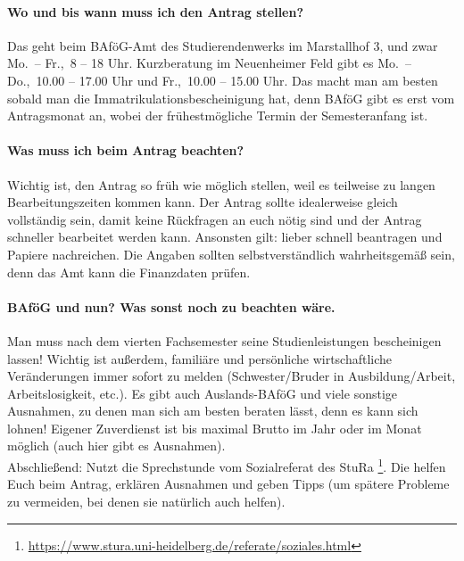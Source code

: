 \paragraph{Wo und bis wann muss ich den Antrag stellen?}
Das geht beim BAföG-Amt des Studierendenwerks im Marstallhof 3, und zwar Mo.\ -- Fr.,\ 8 -- 18 Uhr. Kurzberatung im Neuenheimer Feld gibt es Mo.\ -- Do.,\ 10.00 -- 17.00 Uhr und Fr.,\ 10.00 -- 15.00 Uhr. Das macht man am besten sobald man die Immatrikulationsbescheinigung hat, denn BAföG gibt es erst vom Antragsmonat an, wobei der frühestmögliche Termin der Semesteranfang ist.

\paragraph{Was muss ich beim Antrag beachten?}
Wichtig ist, den Antrag so früh wie möglich stellen, weil es teilweise zu langen Bearbeitungszeiten kommen kann. Der Antrag sollte idealerweise gleich vollständig sein, damit keine Rückfragen an euch nötig sind und der Antrag schneller bearbeitet werden kann. Ansonsten gilt: lieber schnell beantragen und Papiere nachreichen. Die Angaben sollten selbstverständlich wahrheitsgemäß sein, denn das Amt kann die Finanzdaten prüfen.

\paragraph{BAföG und nun? Was sonst noch zu beachten wäre.}
Man muss nach dem vierten Fachsemester seine Studienleistungen bescheinigen lassen! Wichtig ist außerdem,  familiäre und persönliche wirtschaftliche Veränderungen immer sofort zu melden (Schwester/Bruder in Ausbildung/Arbeit, Arbeitslosigkeit, etc.). Es gibt auch Auslands-BAföG und viele sonstige Ausnahmen, zu denen man sich am besten beraten lässt, denn es kann sich lohnen! Eigener Zuverdienst ist bis maximal  Brutto im Jahr oder  im Monat möglich (auch hier gibt es Ausnahmen).\\[5mm]

\noindent Abschließend: Nutzt die Sprechstunde vom Sozialreferat des \gls{StuRa} \footnote{\url{https://www.stura.uni-heidelberg.de/referate/soziales.html}}. Die helfen Euch beim Antrag, erklären Ausnahmen und geben Tipps (um spätere Probleme zu vermeiden, bei denen sie natürlich auch helfen).
